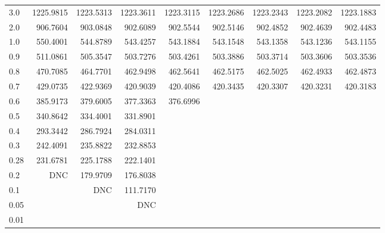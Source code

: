 \begin{landscape}
\begin{table}
\begin{center}
\begin{tabular}{l|rrrrrrrr}
\hline \hline
3.0 &  1225.9815 & 1223.5313 & 1223.3611 & 1223.3115 & 1223.2686 & 1223.2343 & 1223.2082 & 1223.1883 \\ 
2.0 &   906.7604 &  903.0848 &  902.6089 &  902.5544 &  902.5146 &  902.4852 &  902.4639 &  902.4483 \\ 
1.0 &   550.4001 &  544.8789 &  543.4257 &  543.1884 &  543.1548 &  543.1358 &  543.1236 &  543.1155 \\ 
0.9 &   511.0861 &  505.3547 &  503.7276 &  503.4261 &  503.3886 &  503.3714 &  503.3606 &  503.3536 \\ 
0.8 &   470.7085 &  464.7701 &  462.9498 &  462.5641 &  462.5175 &  462.5025 &  462.4933 &  462.4873 \\ 
0.7 &   429.0735 &  422.9369 &  420.9039 &  420.4086 &  420.3435 &  420.3307 &  420.3231 &  420.3183 \\ 
0.6 &   385.9173 &  379.6005 &  377.3363 &  376.6996 &   \\ 
0.5 &   340.8642 &  334.4001 &  331.8901 &  \\ 
0.4 &   293.3442 &  286.7924 &  284.0311  \\ 
0.3 &   242.4091 &  235.8822 &  232.8853  \\ 
0.28 &  231.6781 &  225.1788 &  222.1401  \\ 
0.2 &   DNC      &  179.9709 &  176.8038  \\ 
0.1 &            &  DNC      &  111.7170  \\ 
0.05 &           &           &  DNC       \\ 
0.01 & \\
\hline \hline
\end{tabular}
\end{center}
\end{table}
\end{landscape}




